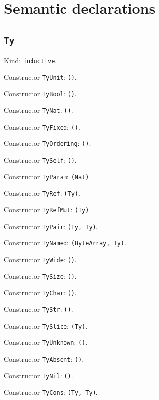 \documentclass[11pt]{article}
\begin{document}
\section*{Semantic declarations}
\subsection*{\texttt{Ty}}
\noindent Kind: \texttt{inductive}.\par
\noindent Constructor \texttt{TyUnit}: \texttt{()}.\par
\noindent Constructor \texttt{TyBool}: \texttt{()}.\par
\noindent Constructor \texttt{TyNat}: \texttt{()}.\par
\noindent Constructor \texttt{TyFixed}: \texttt{()}.\par
\noindent Constructor \texttt{TyOrdering}: \texttt{()}.\par
\noindent Constructor \texttt{TySelf}: \texttt{()}.\par
\noindent Constructor \texttt{TyParam}: \texttt{(Nat)}.\par
\noindent Constructor \texttt{TyRef}: \texttt{(Ty)}.\par
\noindent Constructor \texttt{TyRefMut}: \texttt{(Ty)}.\par
\noindent Constructor \texttt{TyPair}: \texttt{(Ty, Ty)}.\par
\noindent Constructor \texttt{TyNamed}: \texttt{(ByteArray, Ty)}.\par
\noindent Constructor \texttt{TyWide}: \texttt{()}.\par
\noindent Constructor \texttt{TySize}: \texttt{()}.\par
\noindent Constructor \texttt{TyChar}: \texttt{()}.\par
\noindent Constructor \texttt{TyStr}: \texttt{()}.\par
\noindent Constructor \texttt{TySlice}: \texttt{(Ty)}.\par
\noindent Constructor \texttt{TyUnknown}: \texttt{()}.\par
\noindent Constructor \texttt{TyAbsent}: \texttt{()}.\par
\noindent Constructor \texttt{TyNil}: \texttt{()}.\par
\noindent Constructor \texttt{TyCons}: \texttt{(Ty, Ty)}.\par
\end{document}
